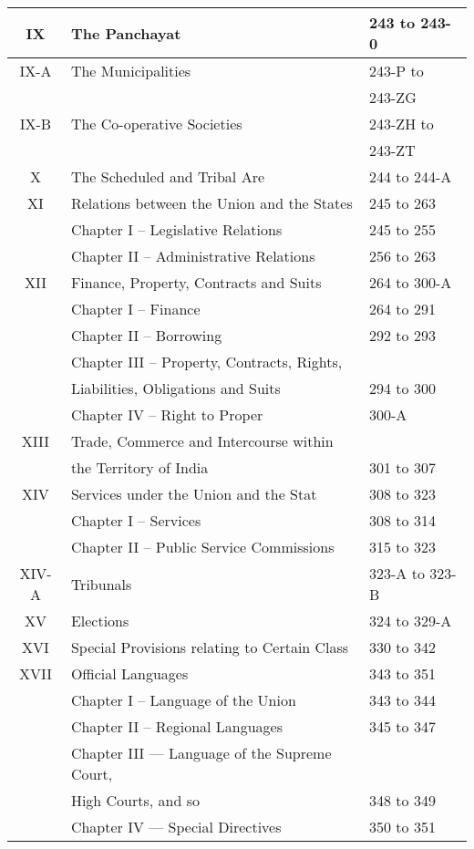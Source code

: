 \begin{longtable}[c]{@{}|c|l|l|@{}}
  IX & The Panchayat & 243 to 243-0 \\\midrule
  IX-A & The Municipalities & 243-P to\\
       &                  & 243-ZG \\\midrule
  IX-B & The Co-operative Societies & 243-ZH to \\
  & & 243-ZT \\\midrule
  X & The Scheduled and Tribal Are & 244 to 244-A \\\midrule
  XI & Relations between the Union and the States & 245 to 263 \\
  & Chapter I – Legislative Relations & 245 to 255 \\
  & Chapter II – Administrative Relations & 256 to 263 \\\midrule
  XII & Finance, Property, Contracts and Suits & 264 to 300-A \\*\midrule
  & Chapter I – Finance & 264 to 291 \\
  & Chapter II – Borrowing & 292 to 293 \\
  & Chapter III – Property, Contracts, Rights, &  \\
  & Liabilities, Obligations and Suits & 294 to 300 \\
  & Chapter IV – Right to Proper & 300-A \\ \midrule
  XIII & Trade, Commerce and Intercourse within & \\
       & the Territory of India & 301 to 307 \\\midrule
  XIV & Services under the Union and the Stat & 308 to 323 \\
  & Chapter I – Services & 308 to 314 \\
  & Chapter II – Public Service Commissions & 315 to 323 \\\midrule
  XIV-A & Tribunals & 323-A to 323-B \\\midrule
  XV & Elections & 324 to 329-A \\\midrule
  XVI & Special Provisions relating to Certain Class & 330 to 342 \\\midrule
  XVII & Official Languages & 343 to 351 \\
  & Chapter I – Language of the Union & 343 to 344 \\
  & Chapter II – Regional Languages & 345 to 347 \\
  & Chapter III — Language of the Supreme Court, & \\
  & High Courts, and so & 348 to 349 \\
  & Chapter IV — Special Directives & 350 to 351 \\\midrule

\end{longtable}
